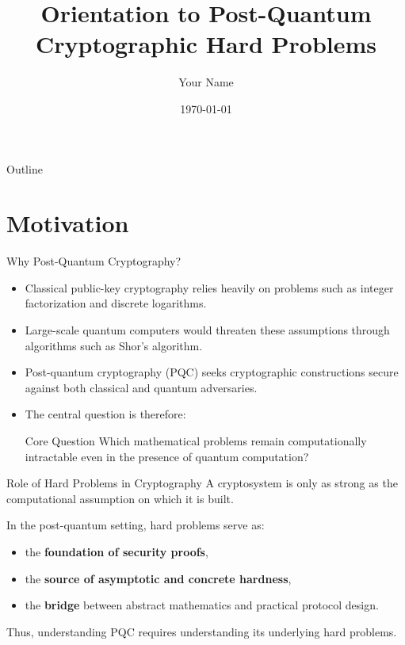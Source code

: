 \documentclass[aspectratio=169]{beamer}
\title[PQC Hard Problem Orientation]{Orientation to Post-Quantum Cryptographic Hard Problems}
\author{Your Name}
\institute{Your Institution / Research Group}
\date{\today}
\begin{document}
	
	\begin{frame}
		\titlepage
	\end{frame}
	
	\begin{frame}{Outline}
		\tableofcontents
	\end{frame}
	
	\section{Motivation}
	
	\begin{frame}{Why Post-Quantum Cryptography?}
		\begin{itemize}
			\item Classical public-key cryptography relies heavily on problems such as integer factorization and discrete logarithms.
			\item Large-scale quantum computers would threaten these assumptions through algorithms such as Shor's algorithm.
			\item Post-quantum cryptography (PQC) seeks cryptographic constructions secure against both classical and quantum adversaries.
			\item The central question is therefore:
			\begin{block}{Core Question}
				Which mathematical problems remain computationally intractable even in the presence of quantum computation?
			\end{block}
		\end{itemize}
	\end{frame}
	
	\begin{frame}{Role of Hard Problems in Cryptography}
		A cryptosystem is only as strong as the computational assumption on which it is built.
		
		\vspace{0.5em}
		In the post-quantum setting, hard problems serve as:
		\begin{itemize}
			\item the \textbf{foundation of security proofs},
			\item the \textbf{source of asymptotic and concrete hardness},
			\item the \textbf{bridge} between abstract mathematics and practical protocol design.
		\end{itemize}
		
		\vspace{0.5em}
		Thus, understanding PQC requires understanding its underlying hard problems.
	\end{frame}
	
\end{document}
